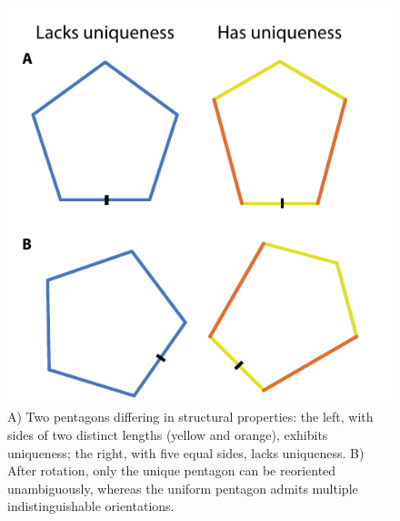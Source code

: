 \documentclass[10pt,twocolumn]{article}
\numberwithin{equation}{section} %
\begin{document}
    \begin{figure}[htbp]
        \centering
        \includegraphics[width=\linewidth]{figures/two-shapes}%
        \caption{A) Two pentagons differing in structural properties: the left, with sides of two distinct lengths (yellow and orange), exhibits uniqueness; the right, with five equal sides, lacks uniqueness.
        B) After rotation, only the unique pentagon can be reoriented unambiguously, whereas the uniform pentagon admits multiple indistinguishable orientations.}
        \label{fig:shapes}
    \end{figure}
\end{document}
